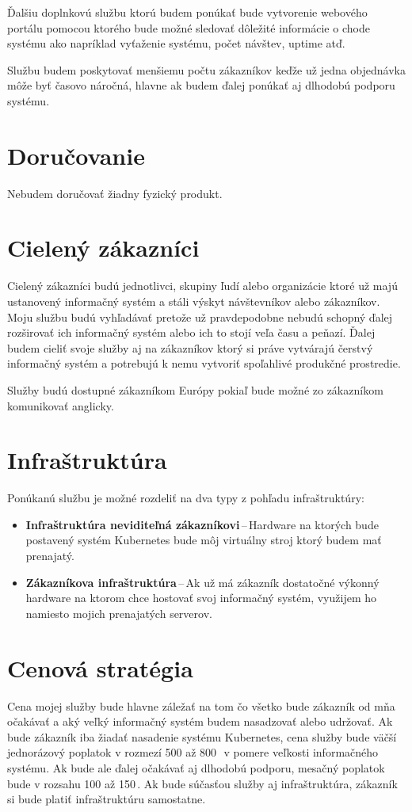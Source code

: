Ďalšiu doplnkovú službu ktorú budem ponúkať bude vytvorenie webového portálu pomocou ktorého bude možné sledovať dôležité informácie o chode systému ako napríklad vyťaženie systému, počet návštev, uptime atď.

Službu budem poskytovať menšiemu počtu zákazníkov keďže už jedna objednávka môže byť časovo náročná, hlavne ak budem ďalej ponúkať aj dlhodobú podporu systému.

\section{Doručovanie}

Nebudem doručovať žiadny fyzický produkt.

\section{Cielený zákazníci}

Cielený zákazníci budú jednotlivci, skupiny ľudí alebo organizácie ktoré už majú ustanovený informačný systém a stáli výskyt návštevníkov alebo zákazníkov. Moju službu budú vyhľadávať pretože už pravdepodobne nebudú schopný ďalej rozširovať ich informačný systém alebo ich to stojí veľa času a peňazí. Ďalej budem cieliť svoje služby aj na zákazníkov ktorý si práve vytvárajú čerstvý informačný systém a potrebujú k nemu vytvoriť spoľahlivé produkčné prostredie.

Služby budú dostupné zákazníkom Európy pokiaľ bude možné zo zákazníkom komunikovať anglicky.

\section{Infraštruktúra}

Ponúkanú službu je možné rozdeliť na dva typy z pohľadu infraštruktúry:
\begin{itemize}
  \item \textbf{Infraštruktúra neviditeľná zákazníkovi}\,--\,Hardware na ktorých bude postavený systém Kubernetes bude môj virtuálny stroj ktorý budem mať prenajatý.
  \item \textbf{Zákazníkova infraštruktúra}\,--\,Ak už má zákazník dostatočné výkonný hardware na ktorom chce hostovať svoj informačný systém, využijem ho namiesto mojich prenajatých serverov.
\end{itemize}

\section{Cenová stratégia}
Cena mojej služby bude hlavne záležať na tom čo všetko bude zákazník od mňa očakávať a aký veľký informačný systém budem nasadzovať alebo udržovať. Ak bude zákazník iba žiadať nasadenie systému Kubernetes, cena služby bude väčší jednorázový poplatok v rozmezí 500 až 800\,\texteuro\ v pomere veľkosti informačného systému. Ak bude ale ďalej očakávať aj dlhodobú podporu, mesačný poplatok bude v rozsahu 100 až 150\,\texteuro. Ak bude súčasťou služby aj infraštruktúra, zákazník si bude platiť infraštruktúru samostatne.

